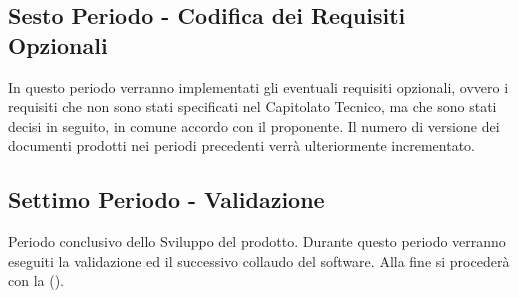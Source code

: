 \documentclass[../PianoDiProgetto_v3.0.0.tex]{subfiles}
\begin{document}
	\subsection{Sesto Periodo - Codifica dei Requisiti Opzionali}
	In questo periodo verranno implementati gli eventuali requisiti opzionali, ovvero i requisiti che non sono stati specificati nel Capitolato Tecnico, ma che sono stati decisi in seguito, in comune accordo con il proponente. Il numero di versione dei documenti prodotti nei periodi precedenti verrà ulteriormente incrementato.
		
	\subsection{Settimo Periodo - Validazione}
	Periodo conclusivo dello Sviluppo del prodotto. Durante questo periodo verranno eseguiti la validazione ed il successivo collaudo del software. Alla fine si procederà con la \revisionediaccettazione (). \\
\end{document}
